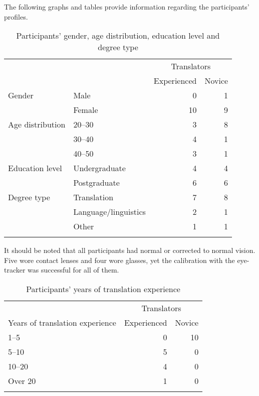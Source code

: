 \documentclass[output=paper]{langscibook}
\begin{document}
The following graphs and tables provide information regarding the participants’ profiles. 


\begin{table}
\caption{Participants’ gender, age distribution, education level and degree type}
\label{tab:1:Participants’ gender, age distribution, education level and degree type}
 \begin{tabular}{llrr}
  \lsptoprule
            &    & \multicolumn{2}{c}{Translators}\\\cmidrule(lr){3-4}
            &    & Experienced & Novice\\            
  \midrule
  Gender    & Male  &  0  & 1\\
            & Female    & 10  & 9\\

  Age distribution  & 20--30 & 3  & 8\\
                    & 30--40 & 4  & 1 \\
                    & 40--50 & 3  & 1\\

  Education level   & Undergraduate  & 4 & 4\\
                    & Postgraduate   & 6 & 6\\

  Degree type   & Translation   & 7  & 8\\
                & Language/linguistics  & 2  & 1\\
                & Other &  1 & 1\\
  \lspbottomrule
 \end{tabular}
\end{table}

It should be noted that all participants had normal or corrected to normal vision. Five wore contact lenses and four wore glasses, yet the calibration  with the eye-tracker was successful for all of them. 

\begin{table}
\caption{Participants’ years of translation experience}
\label{tab:1:Participants’ years of translation experience}
 \begin{tabularx}{.75\textwidth}{Xrr}
  \lsptoprule
                                  & \multicolumn{2}{c}{Translators}\\\cmidrule(lr){2-3}
 Years of translation experience  & Experienced & Novice\\            
  \midrule
  1--5 &  0 & 10\\
  5--10 & 5 & 0\\
  10--20 & 4 & 0\\
  Over 20   & 1 & 0\\
  \lspbottomrule
 \end{tabularx}
\end{table}
\end{document}

